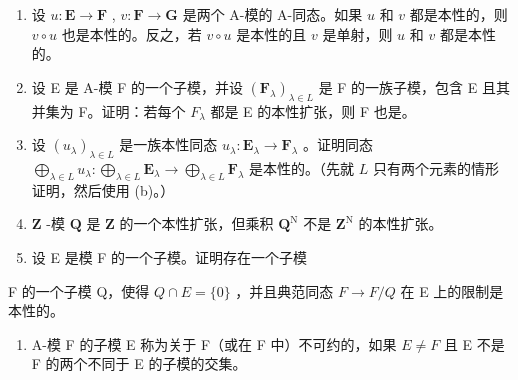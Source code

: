 \begin{enumerate}
\def\labelenumi{(\alph{enumi})}
\item
  设 \(u: \mathbf{E} \to \mathbf{F}\) , \(v: \mathbf{F} \to \mathbf{G}\) 是两个 A-模的 A-同态。如果 \(u\) 和 \(v\) 都是本性的，则 \(v \circ u\) 也是本性的。反之，若 \(v \circ u\) 是本性的且 \(v\) 是单射，则 \(u\) 和 \(v\) 都是本性的。
\item
  设 E 是 A-模 F 的一个子模，并设 \((\mathbf{F}_{\lambda})_{\lambda \in L}\) 是 F 的一族子模，包含 E 且其并集为 F。证明：若每个 \(F_{\lambda}\) 都是 E 的本性扩张，则 F 也是。
\item
  设 \((u_{\lambda})_{\lambda \in L}\) 是一族本性同态 \(u_{\lambda} \colon \mathbf{E}_{\lambda} \to \mathbf{F}_{\lambda}\) 。证明同态 \(\bigoplus_{\lambda \in L} u_{\lambda} \colon \bigoplus_{\lambda \in L} \mathbf{E}_{\lambda} \to \bigoplus_{\lambda \in L} \mathbf{F}_{\lambda}\) 是本性的。（先就 \(L\) 只有两个元素的情形证明，然后使用 (b)。）
\item
  \(\mathbf{Z}\) -模 \(\mathbf{Q}\) 是 \(\mathbf{Z}\) 的一个本性扩张，但乘积 \(\mathbf{Q}^{\mathrm{N}}\) 不是 \(\mathbf{Z}^{\mathrm{N}}\) 的本性扩张。
\item
  设 E 是模 F 的一个子模。证明存在一个子模
\end{enumerate}

F 的一个子模 Q，使得 \(Q \cap E = \{0\}\) ，并且典范同态 \(F \to F/Q\) 在 E 上的限制是本性的。

\begin{enumerate}
\def\labelenumi{\arabic{enumi}.}
\setcounter{enumi}{15}
\tightlist
\item
  A-模 F 的子模 E 称为关于 F（或在 F 中）不可约的，如果 \(E \neq F\) 且 E 不是 F 的两个不同于 E 的子模的交集。
\end{enumerate}

